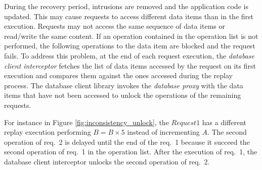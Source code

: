 During the recovery period, intrusions are removed and the application code is updated. This may cause requests to access different data items than in the first execution. Requests may not access the same sequence of data items or read/write the same content. If an operation contained in the operation list is not performed, the following operations to the data item are blocked and the request fails. To address this problem, at the end of each request execution, the \textit{database client interceptor} fetches the list of data items accessed by the request on its first execution and compares them against the ones accessed during the replay process. The database client library invokes the \emph{database proxy} with the data items that have not been accessed to unlock the operations of the remaining requests. 

For instance in Figure \ref{fig:inconsistency_unlock}, the $Request 1$ has a different replay execution performing $B = B \times 5$ instead of incrementing $A$. The second operation of {req.~2} is delayed until the end of the {req.~1} because it succeed the second operation of {req.~1} in the operation list. After the execution of {req.~1}, the database client interceptor unlocks the second operation of {req.~2}.\\


